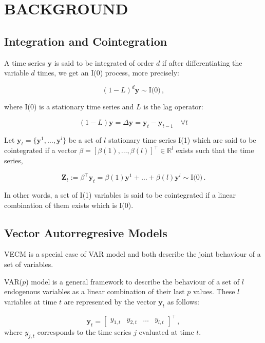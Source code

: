 \section{\uppercase{Background}}
\label{sec:background}
\noindent
\subsection{Integration and Cointegration}
A time series $\mathbf{y}$ is said to be integrated of order $d$ if after
differentiating the variable $d$ times, we get an I(0) process, more precisely:

\[
(1-L)^d \mathbf{y} \sim \text{I(0)} \, ,
\]

\noindent where I(0) is a stationary time series and $L$ is the lag operator:

\[
(1-L)\mathbf{y} = \Delta \mathbf{y}=\mathbf{y}_t  -\mathbf{y}_{t-1} \quad \forall t
\]

Let $\mathbf{y}_t = \{\mathbf{y}^1, \dots, \mathbf{y}^l\}$ be a set of $l$
stationary time series I(1) which are said to be cointegrated if a vector
$\beta=[\beta(1),\dots,\beta(l)]^\top \in \mathbb{R}^l$  exists such that the
time series,

\begin{equation}
 \mathbf{Z}_t:= \beta^\top \mathbf{y}_t = \beta(1) \mathbf{y}^1 + \dots + \beta(l) \mathbf{y}^l \sim
 \text{I(0)}\, .
\end{equation}

In other words, a set of I(1) variables is said to be cointegrated if
a linear combination of them exists which is I(0).


\subsection{Vector Autorregresive Models}\label{sec:varvec}

VECM is a special case of VAR model and both describe the joint behaviour of a
set of variables.

VAR($p$) model is a general framework to describe the behaviour of a set of $l$
endogenous variables as a linear combination of their last $p$ values. These
$l$ variables at time $t$ are represented by the vector $\mathbf{y}_t$ as
follows:

\begin{equation*}
\label{eq:variables}
\mathbf{y}_t = 
\begin{bmatrix} y_{1,t} &
y_{2,t} &
\dots &
y_{l,t}
\end{bmatrix}^\top \, ,
\end{equation*}
\noindent where $y_{j,t}$ corresponds to the time series $j$ evaluated at
time $t$.

